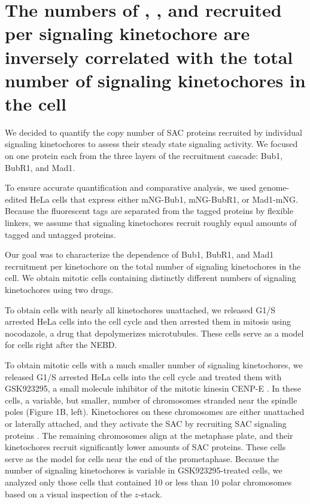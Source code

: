 \section{The numbers of , , and  recruited per signaling kinetochore are inversely correlated with the total number of signaling kinetochores in the cell}

We decided to quantify the copy number of SAC proteins recruited by individual signaling kinetochores to assess their steady state signaling activity. We focused on one protein each from the three layers of the recruitment cascade: Bub1, BubR1, and Mad1.

To ensure accurate quantification and comparative analysis, we used genome-edited HeLa cells that express either mNG-Bub1, mNG-BubR1, or Mad1-mNG. Because the fluorescent tags are separated from the tagged proteins by flexible linkers, we assume that signaling kinetochores recruit roughly equal amounts of tagged and untagged proteins.

Our goal was to characterize the dependence of Bub1, BubR1, and Mad1 recruitment per kinetochore on the total number of signaling kinetochores in the cell. We obtain mitotic cells containing distinctly different numbers of signaling kinetochores using two drugs.

To obtain cells with nearly all kinetochores unattached, we released G1/S arrested HeLa cells into the cell cycle and then arrested them in mitosis using nocodazole, a drug that depolymerizes microtubules. These cells serve as a model for cells right after the NEBD.

To obtain mitotic cells with a much smaller number of signaling kinetochores, we released G1/S arrested HeLa cells into the cell cycle and treated them with GSK923295, a small molecule inhibitor of the mitotic kinesin CENP-E \cite{GSK923295}. In these cells, a variable, but smaller, number of chromosomes stranded near the spindle poles (Figure 1B, left). Kinetochores on these chromosomes are either unattached or laterally attached, and they activate the SAC by recruiting SAC signaling proteins \cite{GSK923295LateralAttachmentEM, GSK923295MonastrolCotreatment}. The remaining chromosomes align at the metaphase plate, and their kinetochores recruit significantly lower amounts of SAC proteins. These cells serve as the model for cells near the end of the prometaphase. Because the number of signaling kinetochores is variable in GSK923295-treated cells, we analyzed only those cells that contained 10 or less than 10 polar chromosomes based on a visual inspection of the $z$-stack.

